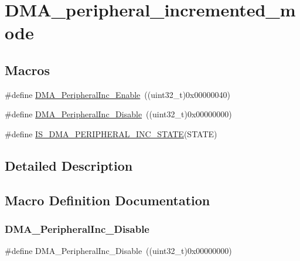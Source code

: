 \hypertarget{group___d_m_a__peripheral__incremented__mode}{}\section{D\+M\+A\+\_\+peripheral\+\_\+incremented\+\_\+mode}
\label{group___d_m_a__peripheral__incremented__mode}
\subsection*{Macros}
\begin{DoxyCompactItemize}
\item 
\#define \mbox{\hyperlink{group___d_m_a__peripheral__incremented__mode_gaf7921ea423fb60701a091c508cd0f33a}{D\+M\+A\+\_\+\+Peripheral\+Inc\+\_\+\+Enable}}~((uint32\+\_\+t)0x00000040)
\item 
\#define \mbox{\hyperlink{group___d_m_a__peripheral__incremented__mode_ga0fe3ff9c67bec802dd239fd17c3dbd31}{D\+M\+A\+\_\+\+Peripheral\+Inc\+\_\+\+Disable}}~((uint32\+\_\+t)0x00000000)
\item 
\#define \mbox{\hyperlink{group___d_m_a__peripheral__incremented__mode_ga28762105b3f567c16ba79a47e68ff0fa}{I\+S\+\_\+\+D\+M\+A\+\_\+\+P\+E\+R\+I\+P\+H\+E\+R\+A\+L\+\_\+\+I\+N\+C\+\_\+\+S\+T\+A\+TE}}(S\+T\+A\+TE)
\end{DoxyCompactItemize}


\subsection{Detailed Description}


\subsection{Macro Definition Documentation}
\mbox{\label{group___d_m_a__peripheral__incremented__mode_ga0fe3ff9c67bec802dd239fd17c3dbd31}} 
\subsubsection{\texorpdfstring{DMA\_PeripheralInc\_Disable}{DMA\_PeripheralInc\_Disable}}
{\footnotesize\ttfamily \#define D\+M\+A\+\_\+\+Peripheral\+Inc\+\_\+\+Disable~((uint32\+\_\+t)0x00000000)}

